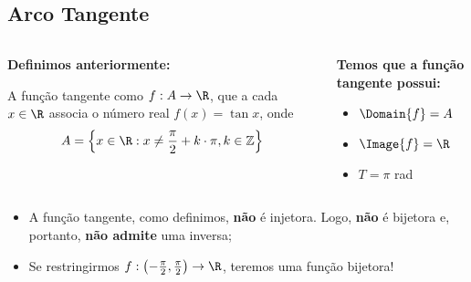 \subsection{Arco Tangente}
\begin{frame}
  \begin{columns}[onlytextwidth]
    \begin{column}{0.49\textwidth}\vspace{-0.5cm}
      \begin{highlight}
        \textbf{Definimos anteriormente:}

        A função tangente como $f:A\rightarrow\R$, que a cada $x\in\R$ associa o número real $f(x)=\tan{x}$, onde\vspace*{-0.25cm}
        \begin{equation*}
          A=\left\{x\in\R : x\not= \frac{\pi}{2} + k\cdot\pi, k\in\mathbb{Z}\right\}\vspace*{-0.8cm}
        \end{equation*}
      \end{highlight}
    \end{column}
    \begin{column}{0.49\textwidth}\vspace*{-0.5cm}
      \begin{highlight}
        \textbf{Temos que a função tangente possui:}
        \begin{itemize}
          \item $\Domain{f} = A$
          \item $\Image{f} = \R$
          \item $T = \pi$ rad
        \end{itemize}
      \end{highlight}
    \end{column}
  \end{columns}
  \begin{figure}
  \end{figure}
  \vspace*{-1.75em}
  \begin{itemize}
    \item A função tangente, como definimos, \textbf{não} é injetora. Logo, \textbf{não} é bijetora e, portanto, \textbf{não admite} uma inversa;
    \item<2> Se restringirmos $f:\left(-\frac{\pi}{2},\frac{\pi}{2}\right)\rightarrow\R$, teremos uma função bijetora!
  \end{itemize}
\end{frame}

